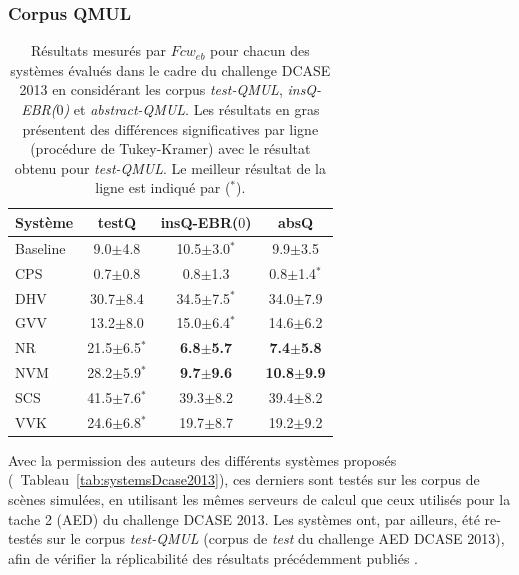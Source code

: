 \subsubsection{Corpus QMUL}

\begin{table}[t] 
\begin{center}  
\begin{tabular}{lccc}  
Système  & testQ & insQ-EBR($0$) & absQ \\ 
\hline 
Baseline & 9.0$\pm$4.8      & 10.5$\pm$3.0$^*$     & 9.9$\pm$3.5 \\ 
CPS      & 0.7$\pm$0.8      & 0.8$\pm$1.3          & 0.8$\pm$1.4$^*$ \\ 
DHV      & 30.7$\pm$8.4     & 34.5$\pm$7.5$^*$     & 34.0$\pm$7.9 \\ 
GVV      & 13.2$\pm$8.0     & 15.0$\pm$6.4$^*$     & 14.6$\pm$6.2 \\ 
NR       & 21.5$\pm$6.5$^*$ & \textbf{6.8$\pm$5.7} & \textbf{7.4$\pm$5.8} \\ 
NVM      & 28.2$\pm$5.9$^*$ & \textbf{9.7$\pm$9.6} & \textbf{10.8$\pm$9.9} \\ 
SCS      & 41.5$\pm$7.6$^*$ & 39.3$\pm$8.2         & 39.4$\pm$8.2 \\ 
VVK      & 24.6$\pm$6.8$^*$ & 19.7$\pm$8.7         & 19.2$\pm$9.2 \\  
\hline
\end{tabular} 
\end{center} 
\caption[Résultats mesurés par $Fcw_{eb}$ pour chacun des systèmes évalués dans le cadre du challenge DCASE 2013 en considérant les corpus \emph{test-QMUL}, \emph{insQ-EBR($0$)} et \emph{abstract-QMUL}.]{Résultats mesurés par $Fcw_{eb}$ pour chacun des systèmes évalués dans le cadre du challenge DCASE 2013 en considérant les corpus \emph{test-QMUL}, \emph{insQ-EBR($0$)} et \emph{abstract-QMUL}. Les résultats en gras présentent des différences significatives par ligne (procédure de Tukey-Kramer) avec le résultat obtenu pour \emph{test-QMUL}. Le meilleur résultat de la ligne est indiqué par ($^*$).} 
\label{tab:qmul} 
\end{table} 

Avec la permission des auteurs des différents systèmes proposés (\cf~Tableau~\ref{tab:systemsDcase2013}), ces derniers sont testés sur les corpus de scènes simulées, en utilisant les mêmes serveurs de calcul que ceux utilisés pour la tache 2 (AED) du challenge DCASE 2013. Les systèmes ont, par ailleurs, été re-testés sur le corpus \emph{test-QMUL} (corpus de \emph{test} du challenge AED DCASE 2013), afin de vérifier la réplicabilité des résultats précédemment publiés \citep{Stowell15}.

